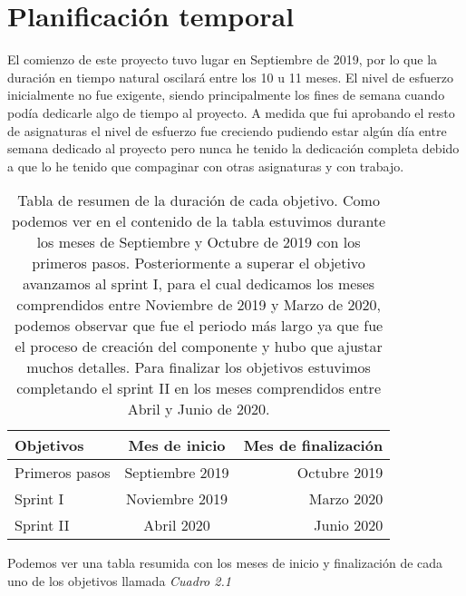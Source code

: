 \documentclass[a4paper, 12pt]{book}
\begin{document}
\section{Planificación temporal}
\label{sec:planificacion-temporal}

El comienzo de este proyecto tuvo lugar en Septiembre de 2019, por lo que la duración en tiempo natural oscilará entre los 10 u 11 meses. El nivel de esfuerzo inicialmente no fue exigente, siendo principalmente los fines de semana cuando podía dedicarle algo de tiempo al proyecto. A medida que fui aprobando el resto de asignaturas el nivel de esfuerzo fue creciendo pudiendo estar algún día entre semana dedicado al proyecto pero nunca he tenido la dedicación completa debido a que lo he tenido que compaginar con otras asignaturas y con trabajo.

\begin{table}
 \begin{center}
  \begin{tabular}{ | l | c | r |} %
    \hline
    Objetivos & Mes de inicio & Mes de finalización \\ \hline
Primeros pasos & Septiembre 2019 & Octubre  2019\\
Sprint I & Noviembre 2019 & Marzo 2020\\
Sprint II & Abril  2020& Junio 2020\\ 
    \hline
  \end{tabular}
  \label{tabla:plani}
  \caption{Tabla de resumen de la duración de cada objetivo. Como podemos ver en el contenido de la tabla estuvimos durante los meses de Septiembre y Octubre de 2019 con los primeros pasos. Posteriormente a superar el objetivo avanzamos al sprint I, para el cual dedicamos los meses comprendidos entre Noviembre de 2019 y Marzo de 2020, podemos observar que fue el periodo más largo ya que fue el proceso de creación del componente y hubo que ajustar muchos detalles. Para finalizar los objetivos estuvimos completando el sprint II en los meses comprendidos entre Abril y Junio de 2020.}
 \end{center}
\end{table}

Podemos ver una tabla resumida con los meses de inicio y finalización de cada uno de los objetivos llamada \emph{Cuadro 2.1}
\end{document}
